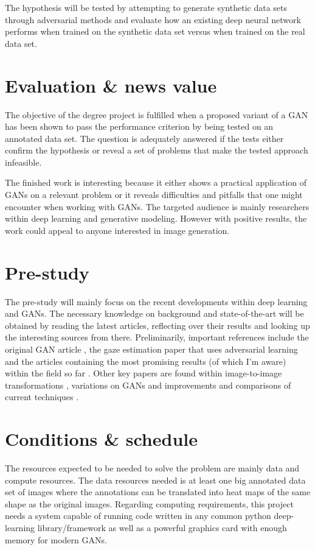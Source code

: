 \documentclass[a4paper]{article}
\begin{document}
The hypothesis will be tested by attempting to generate synthetic data sets through adversarial methods and evaluate how an existing deep neural network performs when trained on the synthetic data set versus when trained on the real data set. 

\section{Evaluation  \& news value}
The objective of the degree project is fulfilled when a proposed variant of a GAN has been shown to pass the performance criterion by being tested on an annotated data set. 
The question is adequately answered if the tests either confirm the hypothesis or reveal a set of problems that make the tested approach infeasible.

The finished work is interesting because it either shows a practical application of GANs on a relevant problem or it reveals difficulties and pitfalls that one might encounter when working with GANs. The targeted audience is mainly researchers within deep learning and generative modeling. However with positive results, the work could appeal to anyone interested in image generation. 

\section{Pre-study}
The pre-study will mainly focus on the recent developments within deep learning
and GANs.
The necessary knowledge on background and state-of-the-art will be obtained by
reading the latest articles, reflecting over their results and
looking up the interesting sources from there.
Preliminarily, important references include the original GAN article
\cite{goodfellow2014generative}, the gaze estimation paper that uses adversarial learning \cite{shrivastava2016learning} and the articles containing the most promising results (of which I'm aware) within the field so far \cite{karras2017progressive, miyato2017spectral}.
Other key papers are found within image-to-image transformations \cite{isola2016image,zhu2017unpaired}, variations on GANs \cite{arjovsky2017wasserstein,berthelot2017began,odena2016conditional} and improvements and comparisons of current techniques \cite{salimans2016improved,gulrajani2017improved,lucic2017gans,xiang2017effects}.

\section{Conditions \& schedule}
The resources expected to be needed to solve the problem are mainly data and
compute resources. The data resources needed
is at least one big annotated data set of images where the annotations can be
translated into heat maps of the same shape as the original images.
Regarding computing requirements, this project needs a
system capable of running code written in any common python deep-learning library/framework as well as a powerful graphics card with enough memory for modern GANs.
\end{document}
